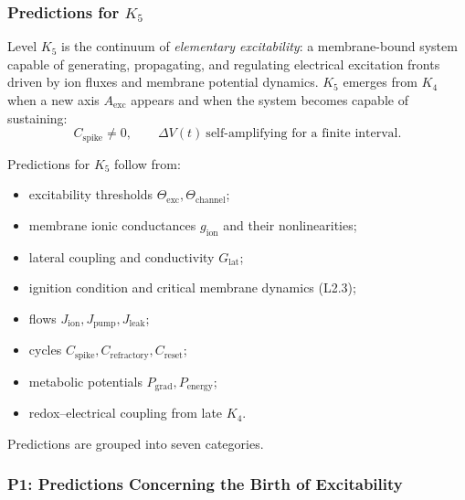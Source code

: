 

\subsubsection{Predictions for \texorpdfstring{$K_5$}{K_5}}
\label{sec:predictions-k5}

Level $K_5$ is the continuum of \emph{elementary excitability}: a membrane-bound
system capable of generating, propagating, and regulating electrical
excitation fronts driven by ion fluxes and membrane potential dynamics.
$K_5$ emerges from $K_4$ when a new axis $A_{\mathrm{exc}}$ appears and when
the system becomes capable of sustaining:
\[
C_{\mathrm{spike}} \neq 0,
\qquad
\Delta V(t) \ \text{self-amplifying for a finite interval}.
\]

Predictions for $K_5$ follow from:
\begin{itemize}
    \item excitability thresholds $\Theta_{\mathrm{exc}},\Theta_{\mathrm{channel}}$;
    \item membrane ionic conductances $g_{\mathrm{ion}}$ and their nonlinearities;
    \item lateral coupling and conductivity $G_{\mathrm{lat}}$;
    \item ignition condition and critical membrane dynamics (L2.3);
    \item flows $J_{\mathrm{ion}},J_{\mathrm{pump}},J_{\mathrm{leak}}$;
    \item cycles $C_{\mathrm{spike}},C_{\mathrm{refractory}},C_{\mathrm{reset}}$;
    \item metabolic potentials $P_{\mathrm{grad}},P_{\mathrm{energy}}$;
    \item redox–electrical coupling from late $K_4$.
\end{itemize}

Predictions are grouped into seven categories.

\subsubsection{P1: Predictions Concerning the Birth of Excitability}

